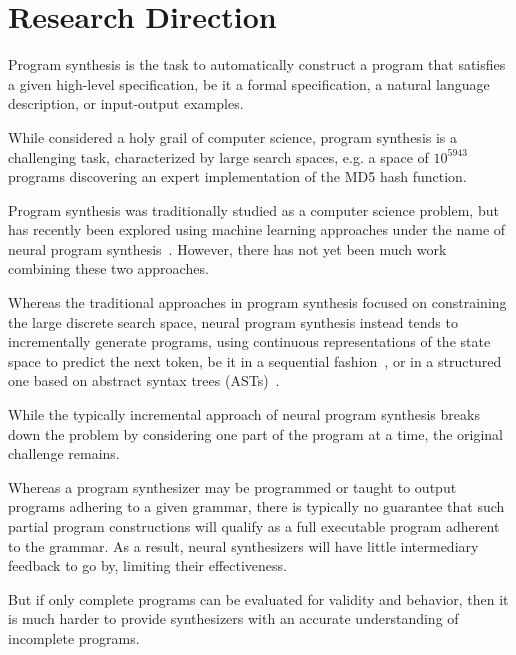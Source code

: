 \documentclass{article}
\begin{document}


\section{Research Direction}

Program synthesis is the task to automatically construct a program that satisfies a given high-level specification,
be it a formal specification, a natural language description, or input-output examples.


While considered a holy grail of computer science, program synthesis is a challenging task, characterized by large search spaces, e.g. a space of $10^{5943}$ programs discovering an expert implementation of the MD5 hash function.~\cite{gulwani2017program}

Program synthesis was traditionally studied as a computer science problem, but has recently been explored using machine learning approaches under the name of neural program synthesis~\citep{nps}.
However, there has not yet been much work combining these two approaches.

Whereas the traditional approaches in program synthesis focused on constraining the large discrete search space, neural program synthesis instead tends to incrementally generate programs, using continuous representations of the state space to predict the next token, be it in a sequential fashion~\citep{alphanpi}, or in a structured one based on abstract syntax trees (ASTs)~\citep{nsps}.

While the typically incremental approach of neural program synthesis breaks down the problem by considering one part of the program at a time, the original challenge remains.

Whereas a program synthesizer may be programmed or taught to output programs adhering to a given grammar, there is typically no guarantee that such partial program constructions will qualify as a full executable program adherent to the grammar.
As a result, neural synthesizers will have little intermediary feedback to go by, limiting their effectiveness.

But if only complete programs can be evaluated for validity and behavior, then 
it is much harder to provide synthesizers with an accurate understanding of incomplete programs.
\end{document}
